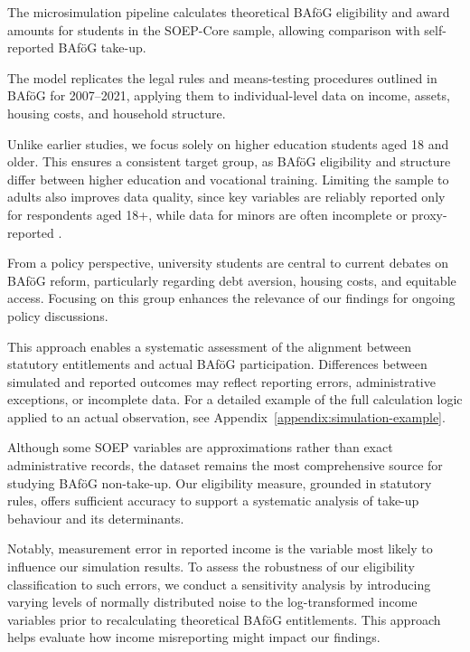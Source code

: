 

The microsimulation pipeline calculates theoretical BAföG eligibility and award amounts for students in the SOEP-Core sample, allowing comparison with self-reported BAföG take-up.

The model replicates the legal rules and means-testing procedures outlined in BAföG \citep{bafoeg_law} for 2007–2021, applying them to individual-level data on income, assets, housing costs, and household structure.

Unlike earlier studies, we focus solely on higher education students aged 18 and older. This ensures a consistent target group, as BAföG eligibility and structure differ between higher education and vocational training. 
Limiting the sample to adults also improves data quality, since key variables are reliably reported only for respondents aged 18+, while data for minors are often incomplete or proxy-reported \citep{soep_pgen_2025, soep_dtc_2005}.

From a policy perspective, university students are central to current debates on BAföG reform, particularly regarding debt aversion, housing costs, and equitable access. Focusing on this group enhances the relevance of our findings for ongoing policy discussions.

This approach enables a systematic assessment of the alignment between statutory entitlements and actual BAföG participation. 
Differences between simulated and reported outcomes may reflect reporting errors, administrative exceptions, or incomplete data. 
For a detailed example of the full calculation logic applied to an actual observation, see Appendix~\ref{appendix:simulation-example}.

Although some SOEP variables are approximations rather than exact administrative records, the dataset remains the most comprehensive source for studying BAföG non-take-up. 
Our eligibility measure, grounded in statutory rules, offers sufficient accuracy to support a systematic analysis of take-up behaviour and its determinants.

Notably, measurement error in reported income is the variable most likely to influence our simulation results. 
To assess the robustness of our eligibility classification to such errors, we conduct a sensitivity analysis by introducing varying levels of normally distributed noise to the log-transformed income variables prior to recalculating theoretical BAföG entitlements. 
This approach helps evaluate how income misreporting might impact our findings.


